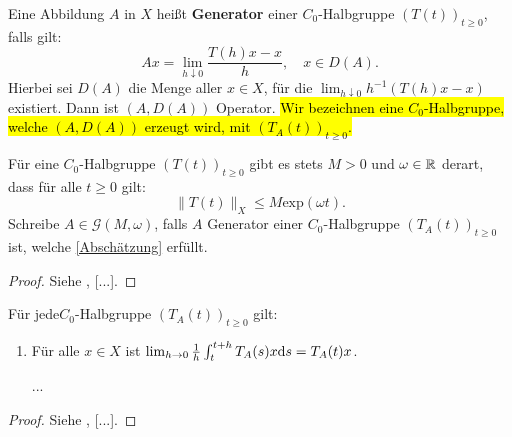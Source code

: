 \begin{defi}
Eine Abbildung $A$ in $X$ heißt \textbf{Generator} einer $C_0$-Halbgruppe $(T(t))_{t\geq0}$, falls gilt:
\begin{equation*}
Ax=\lim_{h\downarrow 0}\frac{T(h)x - x}{h},\quad x\in D(A).
\end{equation*}
Hierbei sei $D(A)$ die Menge aller $x\in X$, für die $\lim_{h\downarrow 0} h^{-1}(T(h)x-x)$ existiert. Dann ist $(A, D(A))$ Operator. \hl{Wir bezeichnen eine $C_0$-Halbgruppe, welche $(A, D(A))$ erzeugt wird, mit $(T_A(t))_{t\geq0}$. }
\end{defi}

\begin{bem}
Für eine $C_0$-Halbgruppe $(T(t))_{t\geq0}$ gibt es stets $M>0$ und $\omega\in \mathbb{R}$ derart, dass für alle $t\geq0$ gilt:
\begin{equation}\label{Abschätzung}
\|T(t)\|_X\leq M\text{exp}(\omega t).
\end{equation}
Schreibe $A\in \mathcal G(M,\omega)$, falls $A$ Generator einer $C_0$-Halbgruppe $(T_A(t))_{t\geq0}$ ist, welche \ref{Abschätzung} erfüllt.
\end{bem}

\begin{proof}
Siehe \cite{engel_nagel_2006}, [...].
\end{proof}


\begin{prop}Für jede$C_0$-Halbgruppe $(T_A(t))_{t\geq0}$ gilt:
\begin{enumerate}
\item Für alle $x\in X$ ist $\lim_{h\to 0}\frac{1}{h}\int_t^{t+h} T_A(s)x\textnormal ds = T_A(t)x$.
\item [...]
\end{enumerate}
\end{prop}

\begin{proof}
Siehe \cite{engel_nagel_2006}, [...].
\end{proof}



